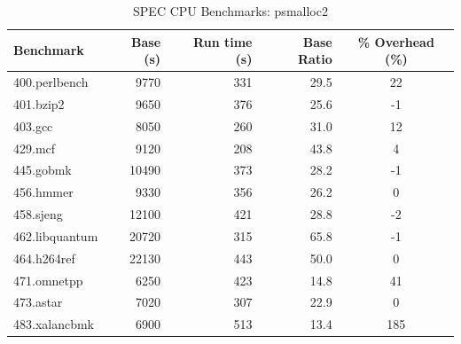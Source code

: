 \documentclass[twoside,12pt]{cslreport}
\begin{document}
\begin{table}
\begin{center}
\begin{tabular}{|l|r|r|r|c|}
\hline
Benchmark  & Base  (s)  & Run time (s) &  Base Ratio & \% Overhead (\%) \\
\hline
400.perlbench    & 9770        & 331       & 29.5 & 22  \\   
401.bzip2        & 9650        & 376       & 25.6 & -1  \\
403.gcc          & 8050        & 260       & 31.0 & 12  \\
429.mcf          & 9120        & 208       & 43.8 & 4   \\
445.gobmk       & 10490        & 373       & 28.2 & -1  \\
456.hmmer       &  9330        & 356       & 26.2 & 0   \\
458.sjeng       & 12100        & 421       & 28.8 & -2  \\
462.libquantum  & 20720        & 315       & 65.8 & -1  \\
464.h264ref     & 22130        & 443       & 50.0 & 0   \\
471.omnetpp     &  6250        & 423       & 14.8 & 41  \\
473.astar       &  7020        & 307       & 22.9 & 0   \\
483.xalancbmk    & 6900        & 513       & 13.4 & 185 \\
\hline
\end{tabular}
\end{center}
\caption{SPEC CPU Benchmarks: psmalloc2}
\label{psmalloc2:spec}
\end{table}
\end{document}
